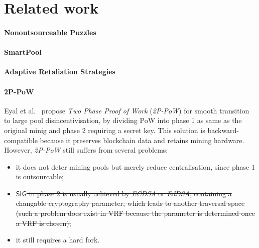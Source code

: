 \section{Related work}

\paragraph{\textbf{Nonoutsourceable Puzzles}}


\paragraph{\textbf{SmartPool}}

\paragraph{\textbf{Adaptive Retaliation Strategies}}

\paragraph{\textbf{2P-PoW}}
Eyal et al.~\cite{2P-PoW} propose \textit{Two Phase Proof of Work} (\textit{2P-PoW}) for smooth transition to large pool disincentivisation, by dividing PoW into phase 1 as same as the original minig and phase 2 requiring a secret key.
This solution is backward-compatible because it preserves blockchain data and retains mining hardware. 
However, \textit{2P-PoW} still suffers from several problems:
\begin{itemize}
\renewcommand\labelitemi{$\circ$}
    \item it does not deter mining pools but merely reduce centralisation, since phase 1 is outsourcable;
    \item \sout{$\mathsf{SIG}$ in phase 2 is usually achieved by \textit{ECDSA} or \textit{EdDSA}, containing a changable cryptography parameter, which leads to another traversal space (such a problem does exist in VRF because the parameter is determined once a VRF is chosen);} 
    \item it still requires a hard fork.
\end{itemize}

